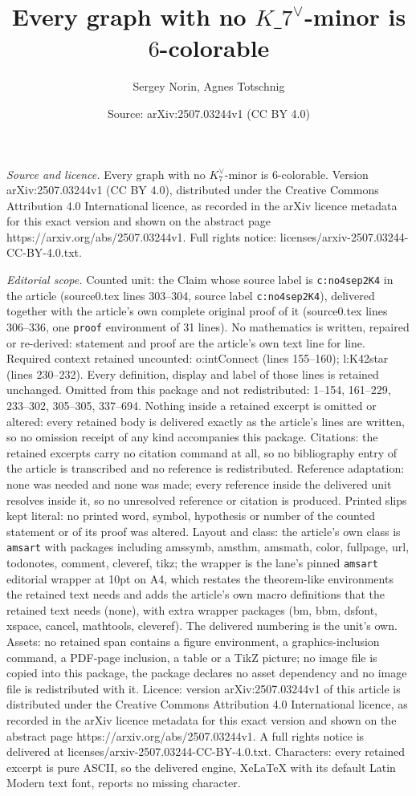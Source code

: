 \documentclass[10pt,a4paper]{amsart}
\title[Every graph with no $K\_7^{\vee}$-minor is $6$-colorable]{Every graph with no $K\_7^{\vee}$-minor is $6$-colorable}
\author{Sergey Norin, Agnes Totschnig}
\date{Source: arXiv:2507.03244v1 (CC BY 4.0)}
\begin{document}
\maketitle

\noindent\emph{Source and licence.} Every graph with no $K_7^{\vee}$-minor is $6$-colorable. Version arXiv:2507.03244v1 (CC BY 4.0), distributed under the Creative Commons Attribution 4.0 International licence, as recorded in the arXiv licence metadata for this exact version and shown on the abstract page https://arxiv.org/abs/2507.03244v1. Full rights notice: licenses/arxiv-2507.03244-CC-BY-4.0.txt.\par\smallskip

\noindent\textit{Editorial scope.} Counted unit: the Claim whose source label is \texttt{c:no4sep2K4} in the article (source0.tex lines 303--304, source label \texttt{c:no4sep2K4}), delivered together with the article's own complete original proof of it (source0.tex lines 306--336, one \texttt{proof} environment of 31 lines). No mathematics is written, repaired or re-derived: statement and proof are the article's own text line for line. Required context retained uncounted: o:intConnect (lines 155--160); l:K42star (lines 230--232). Every definition, display and label of those lines is retained unchanged. Omitted from this package and not redistributed: 1--154, 161--229, 233--302, 305--305, 337--694. Nothing inside a retained excerpt is omitted or altered: every retained body is delivered exactly as the article's lines are written, so no omission receipt of any kind accompanies this package. Citations: the retained excerpts carry no citation command at all, so no bibliography entry of the article is transcribed and no reference is redistributed. Reference adaptation: none was needed and none was made; every reference inside the delivered unit resolves inside it, so no unresolved reference or citation is produced. Printed slips kept literal: no printed word, symbol, hypothesis or number of the counted statement or of its proof was altered. Layout and class: the article's own class is \texttt{amsart} with packages including amssymb, amsthm, amsmath, color, fullpage, url, todonotes, comment, cleveref, tikz; the wrapper is the lane's pinned \texttt{amsart} editorial wrapper at 10pt on A4, which restates the theorem-like environments the retained text needs and adds the article's own macro definitions that the retained text needs (none), with extra wrapper packages (bm, bbm, dsfont, xspace, cancel, mathtools, cleveref). The delivered numbering is the unit's own. Assets: no retained span contains a figure environment, a graphics-inclusion command, a PDF-page inclusion, a table or a TikZ picture; no image file is copied into this package, the package declares no asset dependency and no image file is redistributed with it. Licence: version arXiv:2507.03244v1 of this article is distributed under the Creative Commons Attribution 4.0 International licence, as recorded in the arXiv licence metadata for this exact version and shown on the abstract page https://arxiv.org/abs/2507.03244v1. A full rights notice is delivered at licenses/arxiv-2507.03244-CC-BY-4.0.txt. Characters: every retained excerpt is pure ASCII, so the delivered engine, XeLaTeX with its default Latin Modern text font, reports no missing character.
\end{document}
